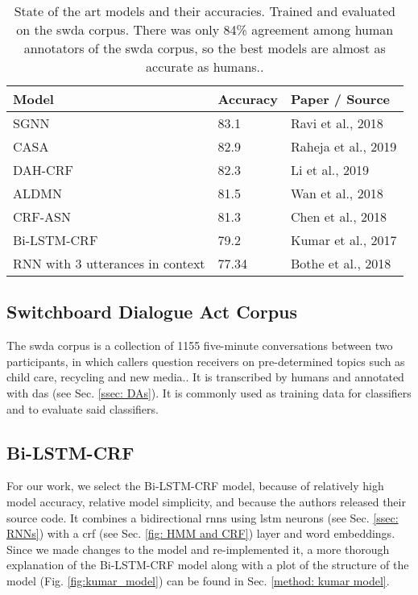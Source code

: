     \begin{table}[h]
    \centering
    \begin{tabular}{|l|l|l|}
    \hline
    \textbf{Model}                   & \textbf{Accuracy} & \textbf{Paper / Source}      \\ \hline
    SGNN                             & 83.1              & Ravi et al., 2018 \cite{ravi2018self}   \\ \hline
    CASA                             & 82.9              & Raheja et al., 2019\cite{raheja2019dialogue} \\ \hline
    DAH-CRF                          & 82.3              & Li et al., 2019 \cite{li2018dual}     \\ \hline
    ALDMN                            & 81.5              & Wan et al., 2018 \cite{wan2018improved}    \\ \hline
    CRF-ASN                          & 81.3              & Chen et al., 2018 \cite{chen2018dialogue}   \\ \hline
    Bi-LSTM-CRF                      & 79.2              & Kumar et al., 2017 \cite{kumar2017dialogue}  \\ \hline
    RNN with 3 utterances in context & 77.34             & Bothe et al., 2018 \cite{bothe2018context}  \\ \hline
    \end{tabular}
    \caption{State of the art \glspl{model} and their accuracies. Trained and evaluated on the \gls{swda} corpus. There was only 84\% agreement among human annotators of the \gls{swda} corpus, so the best \glspl{model} are almost as accurate as humans.\cite{swda}.}
    \label{table: da models}
    \end{table}

    \subsection{Switchboard Dialogue Act Corpus \label{ssec: swda}}
        The \gls{swda} corpus is a collection of 1155 five-minute conversations between two participants, in which callers question receivers on pre-determined topics such as child care, recycling and new media.\cite{fang2012annotation}. It is transcribed by humans and annotated with \glspl{da} (see Sec. \ref{ssec: DAs}). It is commonly used as training data for classifiers and to evaluate said classifiers.

    \subsection{Bi-LSTM-CRF \label{sssec: kumar model}}
    For our work, we select the Bi-LSTM-CRF \gls{model}\cite{kumar2017dialogue}, because of relatively high \gls{model} accuracy, relative \gls{model} simplicity, and because the authors released their source code. It combines a bidirectional \glspl{rnn} using \gls{lstm} \glspl{neuron} (see Sec. \ref{ssec: RNNs}) with a \gls{crf} (see Sec. \ref{fig: HMM and CRF}) layer and word \glspl{embedding}. Since we made changes to the \gls{model} and re-implemented it, a more thorough explanation of the Bi-LSTM-CRF \gls{model} along with a plot of the structure of the \gls{model} (Fig. \ref{fig:kumar_model}) can be found in Sec. \ref{method: kumar model}.
